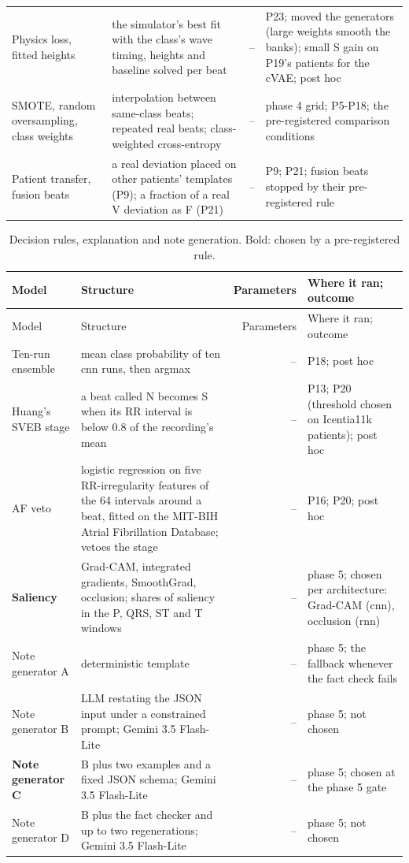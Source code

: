 \begin{longtable}{p{2.6cm}p{6.1cm}rp{4.6cm}}
Physics loss, fitted heights & the simulator's best fit with the class's wave timing, heights and baseline solved per beat & -- & P23; moved the generators (large weights smooth the banks); small S gain on P19's patients for the cVAE; post hoc \\
SMOTE, random oversampling, class weights & interpolation between same-class beats; repeated real beats; class-weighted cross-entropy & -- & phase 4 grid; P5-P18; the pre-registered comparison conditions \\
Patient transfer, fusion beats & a real deviation placed on other patients' templates (P9); a fraction of a real V deviation as F (P21) & -- & P9; P21; fusion beats stopped by their pre-registered rule \\
\end{longtable}
\endgroup
\begingroup\footnotesize
\begin{longtable}{p{2.6cm}p{6.1cm}rp{4.6cm}}
\caption{Decision rules, explanation and note generation. Bold: chosen by a pre-registered rule.}\label{tab:arch-other}\\
\toprule
Model & Structure & Parameters & Where it ran; outcome \\
\midrule
\endfirsthead
\toprule
Model & Structure & Parameters & Where it ran; outcome \\
\midrule
\endhead
\bottomrule
\endfoot
Ten-run ensemble & mean class probability of ten cnn runs, then argmax & -- & P18; post hoc \\
Huang's SVEB stage & a beat called N becomes S when its RR interval is below 0.8 of the recording's mean & -- & P13; P20 (threshold chosen on Icentia11k patients); post hoc \\
AF veto & logistic regression on five RR-irregularity features of the 64 intervals around a beat, fitted on the MIT-BIH Atrial Fibrillation Database; vetoes the stage & -- & P16; P20; post hoc \\
\textbf{Saliency} & Grad-CAM, integrated gradients, SmoothGrad, occlusion; shares of saliency in the P, QRS, ST and T windows & -- & phase 5; chosen per architecture: Grad-CAM (cnn), occlusion (rnn) \\
Note generator A & deterministic template & -- & phase 5; the fallback whenever the fact check fails \\
Note generator B & LLM restating the JSON input under a constrained prompt; Gemini 3.5 Flash-Lite & -- & phase 5; not chosen \\
\textbf{Note generator C} & B plus two examples and a fixed JSON schema; Gemini 3.5 Flash-Lite & -- & phase 5; chosen at the phase 5 gate \\
Note generator D & B plus the fact checker and up to two regenerations; Gemini 3.5 Flash-Lite & -- & phase 5; not chosen \\
\end{longtable}
\endgroup
